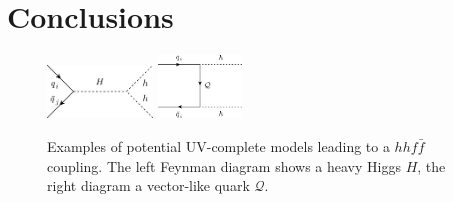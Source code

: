 \section{Conclusions \label{sec:concly}}

\begin{figure}[!t]
	\centering
	\includegraphics[width = 0.25\textwidth]{./fig/qqh_2hdm}
	\hspace{0.5 cm}
	\includegraphics[width = 0.2\textwidth]{./fig/VLQ}
	\caption{Examples of potential UV-complete models leading to a  $hh f \bar{f} $ coupling. The left Feynman diagram shows a heavy Higgs $H$, the right diagram a vector-like quark $\mathcal Q $.} %
	\label{fig_uv_qqhh}
\end{figure}


